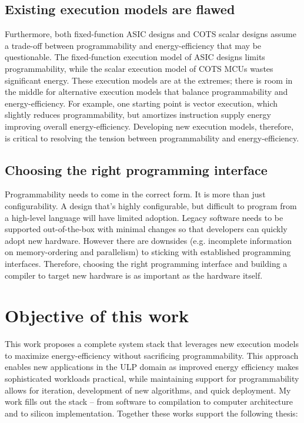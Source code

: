 \subsection{Existing execution models are flawed}
Furthermore, both fixed-function ASIC designs and COTS scalar designs assume a trade-off between programmability and energy-efficiency that may be questionable.
% 
The fixed-function execution model of ASIC designs limits programmability, while the scalar execution model of COTS MCUs wastes significant energy.
% 
These execution models are at the extremes; there is room in the middle for alternative execution models that balance programmability and energy-efficiency.
% 
For example, one starting point is vector execution, which slightly reduces programmability, but amortizes instruction supply energy improving overall energy-efficiency.
% 
Developing new execution models, therefore, is critical to resolving the tension between programmability and energy-efficiency.

\subsection{Choosing the right programming interface}
Programmability needs to come in the correct form.
% 
It is more than just configurability.
% 
A design that's highly configurable, but difficult to program from a high-level language will have limited adoption.
% 
Legacy software needs to be supported out-of-the-box with minimal changes so that developers can quickly adopt new hardware.
% 
However there are downsides (e.g. incomplete information on memory-ordering and parallelism) to sticking with established programming interfaces.
% 
Therefore, choosing the right programming interface and building a compiler to target new hardware is as important as the hardware itself.


\figOverview

\section{Objective of this work}

This work proposes a complete system stack that leverages new execution models to maximize energy-efficiency without sacrificing programmability.
% 
This approach enables new applications in the ULP domain as improved energy efficiency makes sophisticated workloads practical, while maintaining support for programmability allows for iteration, development of new algorithms, and quick deployment. 
% 
My work fills out the stack -- from software to compilation to computer architecture and to silicon implementation.
% 
Together these works support the following thesis:

